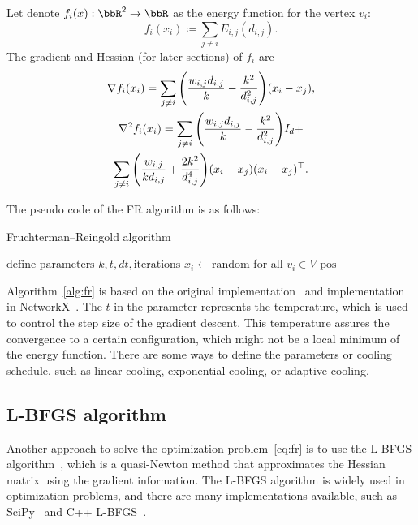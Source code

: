 \documentclass[dvipdfmx,journal]{IEEEtran}
\newcommand{\defeq}{\coloneqq}
\begin{document}
Let denote $f_i(x): \bbR^2 \to \bbR$ as the energy function for the vertex $v_i$:
\begin{equation*}
  f_i(x_i) \defeq \sum_{j \neq i} E_{i,j}(d_{i,j}).
\end{equation*}
The gradient and Hessian (for later sections) of $f_i$ are
\begin{gather*}
  \nabla f_i(x_i) = \sum_{j \neq i} \qty(\frac{w_{i,j}d_{i,j}}{k} - \frac{k^2}{d_{i,j}^2}) (x_i-x_j), \\
  \nabla^2 f_i(x_i) = \sum_{j \neq i} \qty(\frac{w_{i,j}d_{i,j}}{k} - \frac{k^2}{d_{i,j}^2}) I_d +      \\
  \sum_{j \neq i} \qty(\frac{w_{i,j}}{k d_{i,j}} + \frac{2k^2}{d_{i,j}^4}) (x_i - x_j)(x_i - x_j)^\top.
\end{gather*}

The pseudo code of the FR algorithm is as follows:
\begin{algorithm}[ht]
  \caption{Fruchterman--Reingold algorithm}
  \label{alg:fr}

  $\text{define parameters } k, t, dt, \text{iterations}$\;
  $x_i \gets \text{random}$ for all $v_i \in V$\;
  \Return $\text{pos}$
\end{algorithm}

Algorithm~\ref{alg:fr} is based on the original implementation~\cite{fruchtermanGraphDrawingForcedirected1991} and implementation in NetworkX~\cite{osti_960616}.
The $t$ in the parameter represents the temperature, which is used to control the step size of the gradient descent. This temperature assures the convergence to a certain configuration, which might not be a local minimum of the energy function. There are some ways to define the parameters or cooling schedule, such as linear cooling, exponential cooling, or adaptive cooling.

\subsection{L-BFGS algorithm}

Another approach to solve the optimization problem~\eqref{eq:fr} is to use the L-BFGS algorithm~\cite{6183577}, which is a quasi-Newton method that approximates the Hessian matrix using the gradient information. The L-BFGS algorithm is widely used in optimization problems, and there are many implementations available, such as SciPy~\cite{2020SciPy-NMeth} and C++ L-BFGS~\cite{liuLimitedMemoryBFGSMethod2019}.
\end{document}
